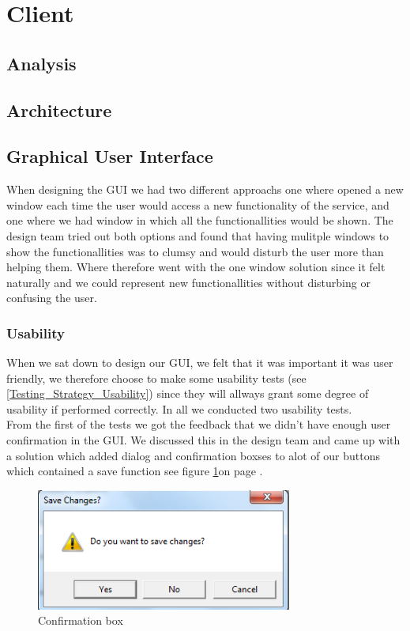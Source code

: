 \section{Client}
\label{Design_Client}

\subsection{Analysis}
\label{Design_Client_Analysis}

\subsection{Architecture}
\label{Design_Client_Architecture}

\subsection{Graphical User Interface}
\label{Design_Client_GUI}
When designing the GUI we had two different approachs one where opened a new window each time the user would access a new functionality of the service, and one where we had window in which all the functionallities would be shown. The design team tried out both options and found that having mulitple windows to show the functionallities was to clumsy and would disturb the user more than helping them. Where therefore went with the one window solution since it felt naturally and we could represent new functionallities without disturbing or confusing the user.

\subsubsection{Usability}
\label{Design_Client_GUI_Usability}
When we sat down to design our GUI, we felt that it was important it was user friendly, we therefore choose to make some usability tests (see \ref{Testing_Strategy_Usability}) since they will allways grant some degree of usability if performed correctly. In all we conducted two usability tests.
\\From the first of the tests we got the feedback that we didn't have enough user confirmation in the GUI. We discussed this in the design team and came up with a solution which added dialog and confirmation boxses to alot of our buttons which contained a save function see figure \ref{fig:Design_Client_GUI_Usability_popup}on page \pageref{fig:Design_Client_GUI_Usability_popup}.

\begin{figure}[h!]
\caption{Confirmation box}
\label{fig:Design_Client_GUI_Usability_popup}
  \centering
\includegraphics[width=0.75\textwidth]{Parts/Images/Design/Confirmationbox}
\end{figure}


